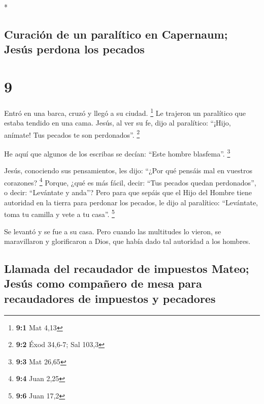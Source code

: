 \begin{paracol}{2}
\begin{otherlanguage}{english}
\end{otherlanguage}

\switchcolumn[0]*

\hypertarget{curaciuxf3n-de-un-paraluxedtico-en-capernaum-jesuxfas-perdona-los-pecados}{%
\subsection{Curación de un paralítico en Capernaum; Jesús perdona los
pecados}\label{curaciuxf3n-de-un-paraluxedtico-en-capernaum-jesuxfas-perdona-los-pecados}}

\hypertarget{section-16}{%
\section{9}\label{section-16}}

 Entró en una barca, cruzó y llegó a su ciudad.
\footnote{\textbf{9:1} Mat 4,13}  Le trajeron un
paralítico que estaba tendido en una cama. Jesús, al ver su fe, dijo al
paralítico: ``¡Hijo, anímate! Tus pecados te son perdonados''.
\footnote{\textbf{9:2} Éxod 34,6-7; Sal 103,3}

 He aquí que algunos de los escribas se decían: ``Este
hombre blasfema''. \footnote{\textbf{9:3} Mat 26,65}

 Jesús, conociendo sus pensamientos, les dijo: ``¿Por qué
pensáis mal en vuestros corazones? \footnote{\textbf{9:4} Juan 2,25}
 Porque, ¿qué es más fácil, decir: ``Tus pecados quedan
perdonados'', o decir: ``Levántate y anda''?  Pero para
que sepáis que el Hijo del Hombre tiene autoridad en la tierra para
perdonar los pecados, le dijo al paralítico: ``Levántate, toma tu
camilla y vete a tu casa''. \footnote{\textbf{9:6} Juan 17,2}

 Se levantó y se fue a su casa.  Pero cuando
las multitudes lo vieron, se maravillaron y glorificaron a Dios, que
había dado tal autoridad a los hombres.

\hypertarget{llamada-del-recaudador-de-impuestos-mateo-jesuxfas-como-compauxf1ero-de-mesa-para-recaudadores-de-impuestos-y-pecadores}{%
\subsection{Llamada del recaudador de impuestos Mateo; Jesús como
compañero de mesa para recaudadores de impuestos y
pecadores}\label{llamada-del-recaudador-de-impuestos-mateo-jesuxfas-como-compauxf1ero-de-mesa-para-recaudadores-de-impuestos-y-pecadores}}


\end{paracol}
